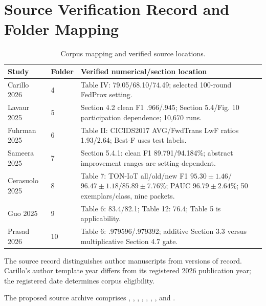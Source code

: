 \documentclass[10pt,a4paper]{article}
\begin{document}
\appendix
\section{Source Verification Record and Folder Mapping}
\label{app:sources}
\begin{table}[htbp]
\centering\footnotesize
\caption{Corpus mapping and verified source locations.}
\label{tab:mapping}
\begin{tabularx}{\linewidth}{L{2.4cm}L{1.0cm}Y}
\toprule
Study & Folder & Verified numerical/section location\\
\midrule
Carillo 2026 & 4 & Table IV: 79.05/68.10/74.49; selected 100-round FedProx setting.\\
Lavaur 2025 & 5 & Section 4.2 clean F1 .966/.945; Section 5.4/Fig. 10 participation dependence; 10,670 runs.\\
Fuhrman 2025 & 6 & Table II: CICIDS2017 AVG/FwdTrans LwF ratios 1.93/2.64; Best-F uses test labels.\\
Sameera 2025 & 7 & Section 5.4.1: clean F1 89.791/94.184\%; abstract improvement ranges are setting-dependent.\\
Cerasuolo 2025 & 8 & Table 7: TON-IoT all/old/new F1 $95.30\pm1.46$/$96.47\pm1.18$/$85.89\pm7.76$\%; PAUC $96.79\pm2.64$\%; 50 exemplars/class, nine packets.\\
Guo 2025 & 9 & Table 6: 83.4/82.1; Table 12: 76.4; Table 5 is applicability.\\
Prasad 2026 & 10 & Table 6: .979596/.979392; additive Section 3.3 versus multiplicative Section 4.7 gate.\\
\bottomrule
\end{tabularx}
\end{table}
The source record distinguishes author manuscripts from versions of record. Carillo's author template year differs from its registered 2026 publication year; the registered date determines corpus eligibility.

The proposed source archive comprises , , , , , , , and .
\end{document}
